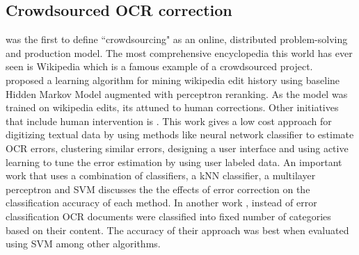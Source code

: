 \documentclass[letterpaper]{article}
\begin{document}
\subsection{Crowdsourced OCR correction }
\cite{crowd} was the first to define ``crowdsourcing" as an online, distributed problem-solving and production model. The most comprehensive encyclopedia this world has ever seen is Wikipedia which is a famous example of a crowdsourced project.\\
\cite{wikiedits} proposed a learning algorithm for mining wikipedia edit history using baseline Hidden Markov Model augmented with perceptron reranking. As the model was trained on wikipedia edits, its attuned to human corrections. Other initiatives that include human intervention is \cite{lowcost}. This work gives a low cost approach for digitizing textual data by using methods like neural network classifier to estimate OCR errors, clustering similar errors, designing a user interface and using active learning to tune the error estimation by using user labeled data.  An important work \cite{velagapudi} that uses a combination of classifiers, a kNN classifier, a multilayer perceptron and SVM discusses the the effects of error correction on the classification accuracy of each method. In another work \cite{hybred}, instead of error classification OCR documents were classified into fixed number of categories based on their content. The accuracy of their approach was best when evaluated using SVM among other algorithms.
\end{document}
